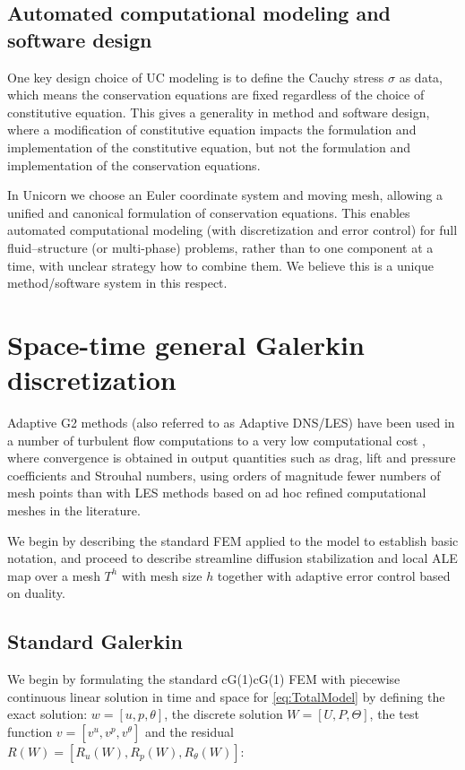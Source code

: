 \subsection{Automated computational modeling and software design}

One key design choice of UC modeling is to define the Cauchy stress
$\sigma$ as data, which means the conservation equations are fixed
regardless of the choice of constitutive equation. This gives a
generality in method and software design, where a modification of
constitutive equation impacts the formulation and implementation of the
constitutive equation, but not the formulation and implementation of the
conservation equations.

In Unicorn we choose an Euler coordinate system and moving mesh,
allowing a unified and canonical formulation of conservation
equations. This enables automated computational modeling (with
discretization and error control) for full fluid--structure (or
multi-phase) problems, rather than to one component at a time, with
unclear strategy how to combine them. We believe this is a unique
method/software system in this respect.

\section{Space-time general Galerkin discretization}

Adaptive G2 methods (also referred to as Adaptive
DNS/LES) have been used in a number of turbulent flow
computations to a very low computational
cost \citep{Hoffman2005,HoffmanJohnson2006b,Hoffman2006,Hoffman2009,HoffmanJansson2009,VilelaJanssonEtAl2010},
where convergence is obtained in output quantities
such as drag, lift and pressure coefficients and
Strouhal numbers, using orders of magnitude fewer
numbers of mesh points than with LES methods based on
ad hoc refined computational meshes in the literature.

We begin by describing the standard FEM applied to the model to
establish basic notation, and proceed to describe streamline diffusion
stabilization and local ALE map over a mesh $T^h$ with mesh size $h$
together with adaptive error control based on duality.

\subsection{Standard Galerkin}

We begin by formulating the standard cG(1)cG(1) FEM
\citep{ErikssonEstepHansboEtAl1996} with piecewise continuous linear solution in time
and space for \ref{eq:TotalModel} by defining the exact solution: $w =
[u, p, \theta]$, the discrete solution $W = [U, P, \Theta]$, the
test function $v = [v^u, v^p, v^\theta]$ and the residual $R(W) =
[R_u(W), R_p(W), R_\theta(W)]$:

